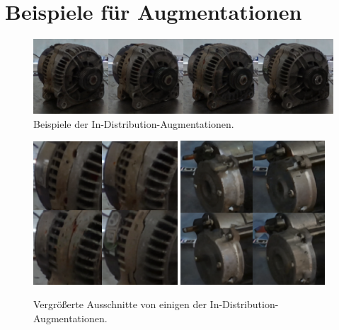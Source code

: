 %
%

\newpage

\section{Beispiele für Augmentationen} \label{sec:app2}

\begin{figure}[h]
  \centering
  \includegraphics[width=\textwidth]{figure_results_id-augs_good_1a.png}
  \caption{Beispiele der In-Distribution-Augmentationen.}
  \label{fig:id-augs-good-1}
\end{figure}

\begin{figure}[h]
  \centering
  \includegraphics[width=0.48\textwidth]{figure_results_id-augs_good_1.png}%
  \hspace{0.02\textwidth}\includegraphics[width=0.48\textwidth]{figure_results_id-augs_good_2.png}%
  \caption{Vergrößerte Ausschnitte von einigen der In-Distribution-Augmentationen.}
  \label{fig:id-augs-good-2}
\end{figure}

